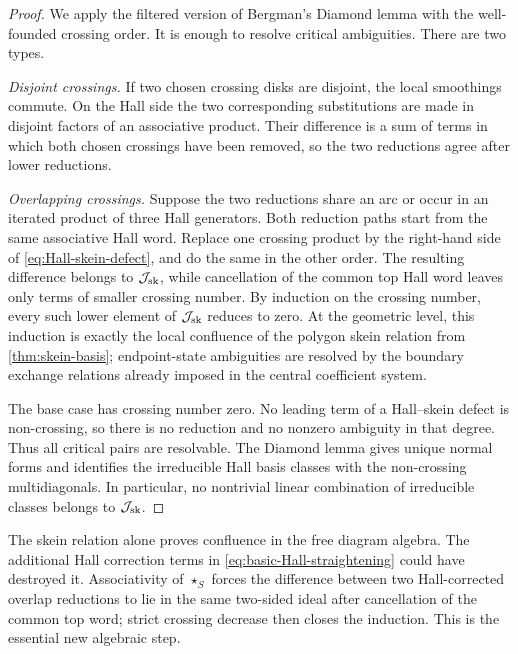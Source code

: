 \begin{proof}
We apply the filtered version of Bergman's Diamond lemma with the
well-founded crossing order.  It is enough to resolve critical ambiguities.
There are two types.

\smallskip
\noindent\emph{Disjoint crossings.}
If two chosen crossing disks are disjoint, the local smoothings commute.  On
the Hall side the two corresponding substitutions are made in disjoint
factors of an associative product.  Their difference is a sum of terms in
which both chosen crossings have been removed, so the two reductions agree
after lower reductions.

\smallskip
\noindent\emph{Overlapping crossings.}
Suppose the two reductions share an arc or occur in an iterated product of
three Hall generators.  Both reduction paths start from the same associative
Hall word.  Replace one crossing product by the right-hand side of
\eqref{eq:Hall-skein-defect}, and do the same in the other order.  The
resulting difference belongs to $\mathcal J_{\mathrm{sk}}$, while cancellation of the common top
Hall word leaves only terms of smaller crossing number.  By induction on the
crossing number, every such lower element of $\mathcal J_{\mathrm{sk}}$ reduces to zero.  At the
geometric level, this induction is exactly the local confluence of the polygon
skein relation from \cref{thm:skein-basis}; endpoint-state ambiguities are
resolved by the boundary exchange relations already imposed in the central
coefficient system.

The base case has crossing number zero.  No leading term of a Hall--skein
defect is non-crossing, so there is no reduction and no nonzero ambiguity in
that degree.  Thus all critical pairs are resolvable.  The Diamond lemma gives
unique normal forms and identifies the irreducible Hall basis classes with the
non-crossing multidiagonals.  In particular, no nontrivial linear combination
of irreducible classes belongs to $\mathcal J_{\mathrm{sk}}$.
\end{proof}

\begin{remark}
The skein relation alone proves confluence in the free diagram algebra.  The
additional Hall correction terms in
\eqref{eq:basic-Hall-straightening} could have destroyed it.  Associativity of
$\star_S$ forces the difference between two Hall-corrected overlap reductions
to lie in the same two-sided ideal after cancellation of the common top word;
strict crossing decrease then closes the induction.  This is the essential
new algebraic step.
\end{remark}

